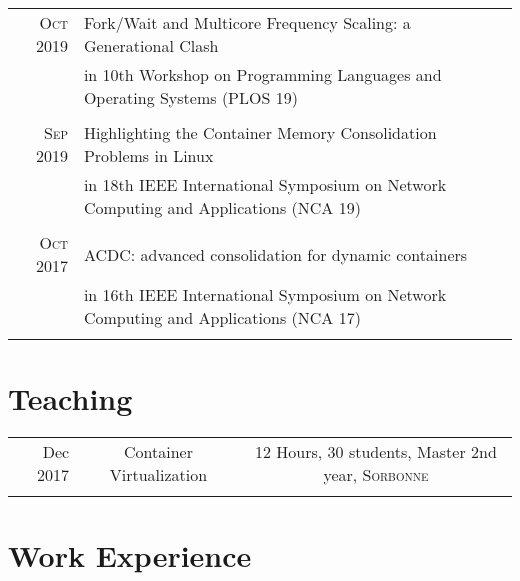 \documentclass[a4paper,10pt]{article} %
\begin{document}
\begin{tabular}{r|l}
\textsc{Oct 2019} & Fork/Wait and Multicore Frequency Scaling: a Generational Clash\\
                  & \footnotesize{in 10th Workshop on Programming Languages and Operating Systems (PLOS 19)}\\
\multicolumn{2}{c}{} \\

\textsc{Sep 2019} & Highlighting the Container Memory Consolidation Problems in Linux\\
                  & \footnotesize{in 18th IEEE International Symposium on Network Computing and Applications (NCA 19)}\\
\multicolumn{2}{c}{} \\

\textsc{Oct 2017} & ACDC: advanced consolidation for dynamic containers\\
                  & \footnotesize{in 16th IEEE International Symposium on Network Computing and Applications (NCA 17)}\\
\multicolumn{2}{c}{} \\
\end{tabular}

\section{Teaching}

\begin{tabular}{r|cc}
Dec 2017 & Container Virtualization & 12 Hours, 30 students, Master 2nd year, \textsc{Sorbonne}\\
\multicolumn{2}{c}{} \\
\end{tabular}

\section{Work Experience}
\end{document}
